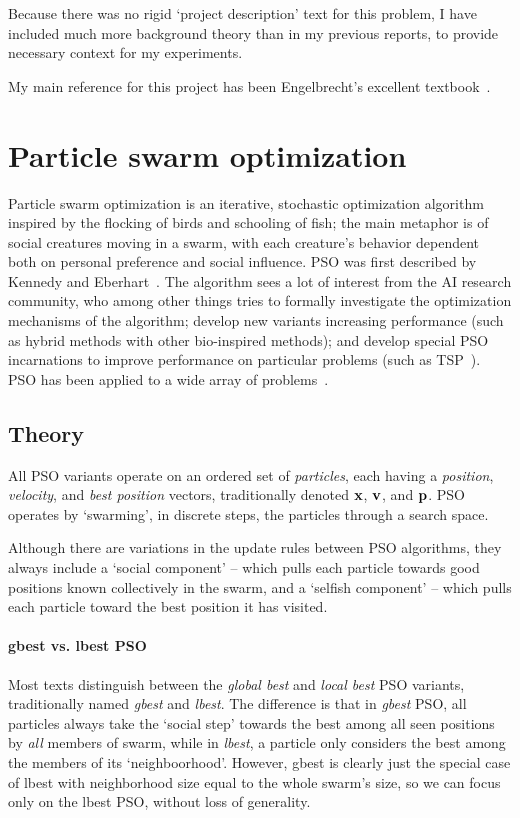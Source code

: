 \documentclass[a4paper,final,9pt]{article}
\begin{document}
Because there was no rigid `project description' text for this problem, I have
included much more background theory than in my previous reports, to provide
necessary context for my experiments. 

My main reference for this project has been Engelbrecht's excellent
textbook~\cite{engelbrecht}.


\section{Particle swarm optimization}
\label{sec:theory}
Particle swarm optimization is an iterative, stochastic optimization algorithm
inspired by the flocking of birds and schooling of fish; the main metaphor is
of social creatures moving in a swarm, with each creature's behavior dependent
both on personal preference and social influence.  PSO was first
described by Kennedy and Eberhart~\cite{kennedy95}. The algorithm sees a lot of
interest from the AI research community, who among other things tries to
formally investigate the optimization mechanisms of the algorithm; develop new
variants increasing performance (such as hybrid methods with other
bio-inspired methods); and develop special PSO incarnations to improve
performance on particular problems (such as TSP~\cite{wangtsp}). PSO has been
applied to a wide array of problems~\cite{poli}.

\subsection{Theory}
All PSO variants operate on an ordered set of \emph{particles}, each having a
\emph{position}, \emph{velocity}, and \emph{best position} vectors,
traditionally denoted $\mathbf{x}$, $\mathbf{v}$, and $\mathbf{p}$.  PSO operates by
`swarming', in discrete steps, the particles through a search space. 

Although there are
variations in the update rules between PSO algorithms, they always include a
`social component' -- which pulls each particle towards good positions known
collectively in the swarm, and a `selfish component' -- which pulls each
particle toward the best position it has visited.

\paragraph{gbest vs. lbest PSO}
Most texts distinguish between the \emph{global best} and \emph{local best}
PSO variants, traditionally named \emph{gbest} and \emph{lbest}.  The
difference is that in \emph{gbest} PSO, all particles always take the `social
step' towards the best among all seen positions by \emph{all} members of
swarm, while in \emph{lbest}, a particle only considers the best among the
members of its `neighboorhood'. However, gbest is clearly just the special
case of lbest with neighborhood size equal to the whole swarm's size, so we
can focus only on the lbest PSO, without loss of generality.
\end{document}
